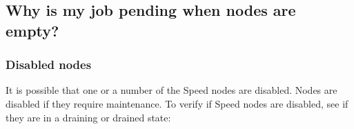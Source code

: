 \subsection{Why is my job pending when nodes are empty?}

\subsubsection{Disabled nodes}

It is possible that one or a number of the Speed nodes are disabled. Nodes are disabled if they require maintenance. 
To verify if Speed nodes are disabled, see if they are in a draining or drained state:


